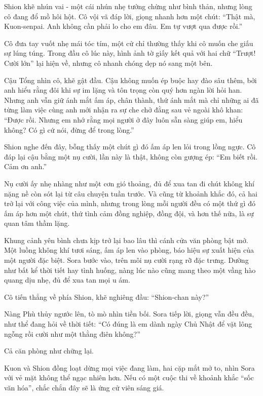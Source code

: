\documentclass[../main.tex]{subfiles}
\begin{document}
Shion khẽ nhún vai - một cái nhún nhẹ tưởng chừng như bình thản, nhưng lòng cô đang đổ mồ hôi hột. Cô vội vã đáp lời, giọng nhanh hơn một chút: ``Thật mà, Kuon-senpai. Anh không cần phải lo cho em đâu. Em tự vượt qua được rồi.''

Cô đưa tay vuốt nhẹ mái tóc tím, một cử chỉ thường thấy khi cô muốn che giấu sự lúng túng. Trong đầu cô lúc này, hình ảnh tờ giấy kết quả với hai chữ ``Trượt! Cười lớn'' lại hiện về, nhưng cô nhanh chóng dẹp nó sang một bên.

Cậu Tổng nhìn cô, khẽ gật đầu. Cậu không muốn ép buộc hay đào sâu thêm, bởi anh hiểu rằng đôi khi sự im lặng và tôn trọng còn quý hơn ngàn lời hỏi han. Nhưng anh vẫn giữ ánh mắt ấm áp, chân thành, thứ ánh mắt mà chỉ những ai đã từng làm việc cùng anh mới nhận ra sự che chở đằng sau vẻ ngoài khô khan: ``Được rồi. Nhưng em nhớ rằng mọi người ở đây luôn sẵn sàng giúp em, hiểu không? Có gì cứ nói, đừng để trong lòng.''

Shion nghe đến đây, bỗng thấy một chút gì đó ấm áp len lỏi trong lồng ngực. Cô đáp lại cậu bằng một nụ cười, lần này là thật, không còn gượng ép: ``Em biết rồi. Cảm ơn anh.''

Nụ cười ấy nhẹ nhàng như một cơn gió thoảng, đủ để xua tan đi chút không khí nặng nề còn sót lại từ câu chuyện tuần trước. Và cũng từ khoảnh khắc đó, cả hai trở lại với công việc của mình, nhưng trong lòng mỗi người đều có một thứ gì đó ấm áp hơn một chút, thứ tình cảm đồng nghiệp, đồng đội, và hơn thế nữa, là sự quan tâm thầm lặng.

\ct

Khung cảnh yên bình chưa kịp trở lại bao lâu thì cánh cửa văn phòng bật mở. Một luồng không khí tươi sáng, ấm áp len vào phòng, báo hiệu sự xuất hiện của một người đặc biệt. Sora bước vào, trên môi nụ cười rạng rỡ đặc trưng. Dường như bất kể thời tiết hay tình huống, nàng lúc nào cũng mang theo một vầng hào quang dịu nhẹ, đủ để xua tan mọi u ám.

Cô tiến thẳng về phía Shion, khẽ nghiêng đầu: ``Shion-chan này?''

Nàng Phù thủy ngước lên, tò mò nhìn tiền bối. Sora tiếp lời, giọng vẫn đều đều, như thể đang hỏi về thời tiết: ``Có đúng là em dành ngày Chủ Nhật để vặt lông ngỗng rồi cười như một thằng điên không?''


Cả căn phòng như chững lại.

Kuon và Shion đồng loạt dừng mọi việc đang làm, hai cặp mắt mở to, nhìn Sora với vẻ mặt không thể ngạc nhiên hơn. Nếu có một cuộc thi về khoảnh khắc ``sốc văn hóa'', chắc chắn đây sẽ là ứng cử viên sáng giá.
\end{document}
